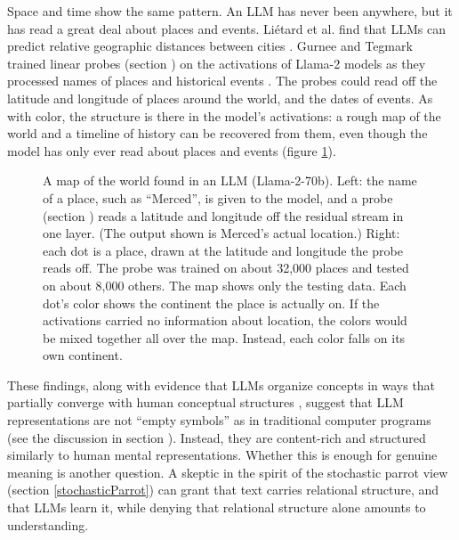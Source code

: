 Space and time show the same pattern. An LLM has never been anywhere, but it
has read a great deal about places and events. Liétard et al. find that LLMs
can predict relative geographic distances between cities \cite{lietard2021do}.
Gurnee and Tegmark trained linear probes (section ) on
the activations of Llama-2 models as they processed names of places and
historical events \cite{gurnee2024language}. The probes could read off the
latitude and longitude of places around the world, and the dates of events. As
with color, the structure is there in the model's activations: a rough map of
the world and a timeline of history can be recovered from them, even though the
model has only ever read about places and events (figure \ref{llmWorldMap}).

\begin{figure}[ht]
\centering
{}
\caption[Right adapted from \cite{gurnee2024language}. Left by Jeff Yoshimi.]{A
map of the world found in an LLM (Llama-2-70b). Left: the name of a place, such
as ``Merced'', is given to the model, and a probe (section
) reads a latitude and longitude off the residual stream
in one layer. (The output shown is Merced's actual location.) Right: each dot is a place, drawn at the latitude and longitude
the probe reads off. The probe was trained on about 32,000 places and tested
on about 8,000 others. The map shows only the testing data. Each dot's color shows
the continent the place is actually on. If the activations carried no
information about location, the colors would be mixed together all over the
map. Instead, each color falls on its own continent.}
\label{llmWorldMap}
\end{figure}

These findings, along with evidence that LLMs organize concepts in ways that
partially converge with human conceptual structures
\cite{christiansen2023large}, suggest that LLM representations are not ``empty symbols'' as in traditional computer programs
(see the discussion in section ). Instead, they
are content-rich and structured similarly to human mental representations.
Whether this is enough for genuine meaning is another question. A skeptic in
the spirit of the stochastic parrot view (section \ref{stochasticParrot}) can grant that
text carries relational structure, and that LLMs learn it, while denying that
relational structure alone amounts to understanding.

